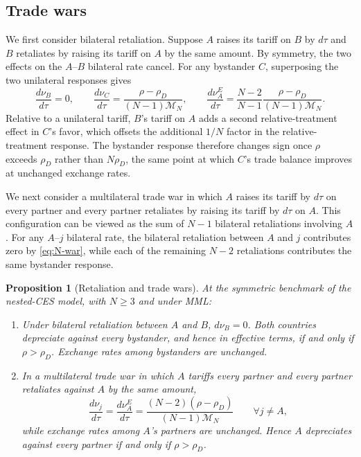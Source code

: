\documentclass[11pt]{article}
\newtheorem{proposition}[theorem]{Proposition}
\begin{document}
\subsection{Trade wars}

We first consider bilateral retaliation. Suppose $A$ raises its tariff on $B$ by $d\tau$ and $B$ retaliates by raising its tariff on $A$ by the same amount. By symmetry, the two effects on the $A$--$B$ bilateral rate cancel. For any bystander $C$, superposing the two unilateral responses gives
\begin{equation}
\frac{d\nu_B}{d\tau}=0, \qquad
\frac{d\nu_C}{d\tau}=\frac{\rho-\rho_D}{(N-1)\mathcal M_N}, \qquad
\frac{d\nu_A^E}{d\tau}=\frac{N-2}{N-1}\frac{\rho-\rho_D}{(N-1)\mathcal M_N}.
\label{eq:N-war}
\end{equation}
Relative to a unilateral tariff, $B$'s tariff on $A$ adds a second relative-treatment effect in $C$'s favor, which offsets the additional $1/N$ factor in the relative-treatment response. The bystander response therefore changes sign once $\rho$ exceeds $\rho_D$ rather than $N\rho_D$, the same point at which $C$'s trade balance improves at unchanged exchange rates.

We next consider a multilateral trade war in which $A$ raises its tariff by $d\tau$ on every partner and every partner retaliates by raising its tariff by $d\tau$ on $A$. This configuration can be viewed as the sum of $N-1$ bilateral retaliations involving $A$. For any $A$--$j$ bilateral rate, the bilateral retaliation between $A$ and $j$ contributes zero by \eqref{eq:N-war}, while each of the remaining $N-2$ retaliations contributes the same bystander response.

\begin{proposition}[Retaliation and trade wars]

At the symmetric benchmark of the nested-CES model, with $N\geq 3$ and under MML:

\begin{enumerate}

\item[(i)] Under bilateral retaliation between $A$ and $B$, $d\nu_B=0$. Both countries depreciate against every bystander, and hence in effective terms, if and only if $\rho>\rho_D$. Exchange rates among bystanders are unchanged.

\item[(ii)] In a multilateral trade war in which $A$ tariffs every partner and every partner retaliates against $A$ by the same amount,
\begin{equation}
\frac{d\nu_j}{d\tau}
=
\frac{d\nu_A^E}{d\tau}
=
\frac{(N-2)(\rho-\rho_D)}{(N-1)\mathcal M_N}
\qquad \forall j\neq A,
\end{equation}
while exchange rates among $A$'s partners are unchanged. Hence $A$ depreciates against every partner if and only if $\rho>\rho_D$.
\end{enumerate}
\label{prop:trade-wars}
\end{proposition}
\end{document}
